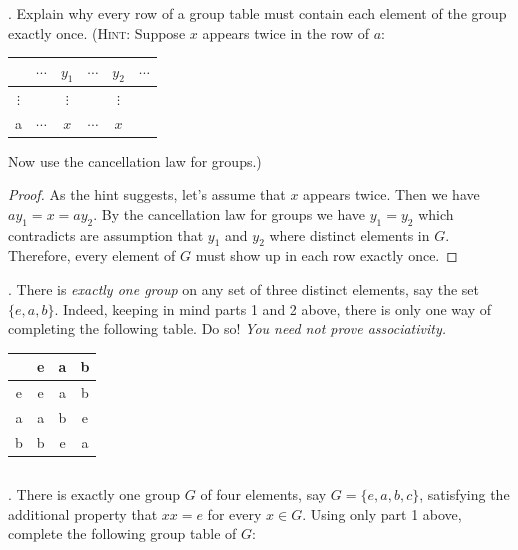 \documentclass[twoside]{amsart}
\begin{document}
\begin{enumerate}[A.]
\begin{enumerate}[(a)]
      . Explain why every row of a group table must contain each
      element of the group exactly once. (\textsc{Hint}: Suppose $x$
      appears twice in the row of $a$:

      \begin{table}[ht]
      \begin{tabular}{c|ccccc}
               & $\cdots$ & $y_1$    & $\cdots$ & $y_2$    & $\cdots$ \\ \hline
      $\vdots$ &          & $\vdots$ &          & $\vdots$ &          \\
             a & $\cdots$ & $x$      & $\cdots$ &  $x$     &          \\
      \end{tabular}
      \end{table}
      Now use the cancellation law for groups.)

      \begin{proof}
      As the hint suggests, let's assume that $x$ appears twice. Then we
      have $ay_1 = x = ay_2$. By the cancellation law for groups we
      have $y_1=y_2$ which contradicts are assumption that $y_1$ and
      $y_2$ where distinct elements in $G$. Therefore, every element
      of $G$ must show up in each row exactly once.
      \end{proof}

      . There is \emph{exactly one group} on any set of three
      distinct elements, say the set $\{e,a,b\}$. Indeed, keeping in mind
      parts 1 and 2 above, there is only one way of completing the following
      table. Do so! \emph{You need not prove associativity.}

      \begin{center}
      \begin{tabular}{c|ccc}
           & e & a & b \\ \hline
         e & e & a & b \\
	 a & a & b & e \\
	 b & b & e & a
      \end{tabular}
      \end{center}

      \tiny \begin{verbatim}

      \end{verbatim}
      \normalsize

      . There is exactly one group $G$ of four elements, say
      $G = \{e,a,b,c\}$, satisfying the additional property that
      $xx = e$ for every $x \in G$. Using only part 1 above, complete
      the following group table of $G$:


\end{enumerate}
\end{enumerate}
\end{document}
